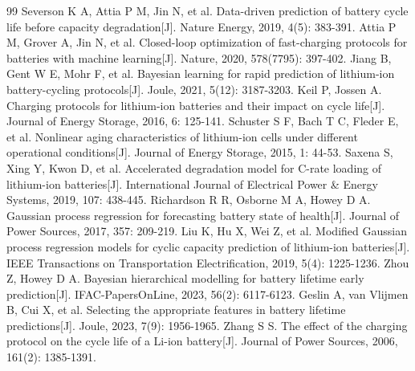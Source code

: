 \documentclass[withoutpreface,bwprint]{cumcmthesis}
\begin{document}
\begin{thebibliography}{99}
 Severson K A, Attia P M, Jin N, et al. Data-driven prediction of battery cycle life before capacity degradation[J]. Nature Energy, 2019, 4(5): 383-391.
 Attia P M, Grover A, Jin N, et al. Closed-loop optimization of fast-charging protocols for batteries with machine learning[J]. Nature, 2020, 578(7795): 397-402.
 Jiang B, Gent W E, Mohr F, et al. Bayesian learning for rapid prediction of lithium-ion battery-cycling protocols[J]. Joule, 2021, 5(12): 3187-3203.
 Keil P, Jossen A. Charging protocols for lithium-ion batteries and their impact on cycle life[J]. Journal of Energy Storage, 2016, 6: 125-141.
 Schuster S F, Bach T C, Fleder E, et al. Nonlinear aging characteristics of lithium-ion cells under different operational conditions[J]. Journal of Energy Storage, 2015, 1: 44-53.
 Saxena S, Xing Y, Kwon D, et al. Accelerated degradation model for C-rate loading of lithium-ion batteries[J]. International Journal of Electrical Power \& Energy Systems, 2019, 107: 438-445.
 Richardson R R, Osborne M A, Howey D A. Gaussian process regression for forecasting battery state of health[J]. Journal of Power Sources, 2017, 357: 209-219.
 Liu K, Hu X, Wei Z, et al. Modified Gaussian process regression models for cyclic capacity prediction of lithium-ion batteries[J]. IEEE Transactions on Transportation Electrification, 2019, 5(4): 1225-1236.
 Zhou Z, Howey D A. Bayesian hierarchical modelling for battery lifetime early prediction[J]. IFAC-PapersOnLine, 2023, 56(2): 6117-6123.
 Geslin A, van Vlijmen B, Cui X, et al. Selecting the appropriate features in battery lifetime predictions[J]. Joule, 2023, 7(9): 1956-1965.
 Zhang S S. The effect of the charging protocol on the cycle life of a Li-ion battery[J]. Journal of Power Sources, 2006, 161(2): 1385-1391.
\end{thebibliography}
\end{document}
